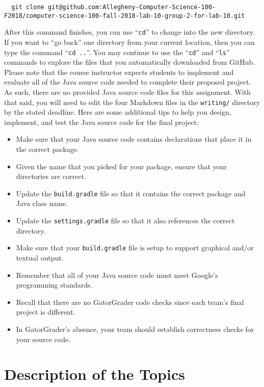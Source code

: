 \documentclass[11pt]{article}
\newcommand{\command}[1]{``\lstinline{#1}''}
\newcommand{\program}[1]{\lstinline{#1}}
\newcommand{\step}[1]{``{#1}''}
\begin{document}
\begin{lstlisting}
  git clone git@github.com:Allegheny-Computer-Science-100-F2018/computer-science-100-fall-2018-lab-10-group-2-for-lab-10.git
\end{lstlisting}

After this command finishes, you can use \command{cd} to change into the new
directory. If you want to \step{go back} one directory from your current
location, then you can type the command \command{cd ..}. You may continue to use
the \command{cd} and \command{ls} commands to explore the files that you
automatically downloaded from GitHub. Please note that the course instructor
expects students to implement and evaluate all of the Java source code needed to
complete their proposed project. As such, there are no provided Java source code
files for this assignment. With that said, you will need to edit the four
Markdown files in the \program{writing/} directory by the stated deadline. Here
are some additional tips to help you design, implement, and test the Java source
code for the final project:

\begin{itemize}
  \item Make sure that your Java source code contains declarations that place it in the correct package.
  \item Given the name that you picked for your package, ensure that your directories are correct.
  \item Update the \program{build.gradle} file so that it contains the correct package and Java class name.
  \item Update the \program{settings.gradle} file so that it also references the correct directory.
  \item Make sure that your \program{build.gradle} file is setup to support graphical and/or textual output.
  \item Remember that all of your Java source code must meet Google's programming standards.
  \item Recall that there are no GatorGrader code checks since each team's final project is different.
  \item In GatorGrader's absence, your team should establish correctness checks for your source code.
\end{itemize}

\section*{Description of the Topics}
\end{document}
